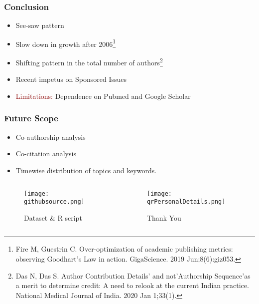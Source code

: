 \documentclass[14pt, aspectratio=169]{beamer}
\begin{document}
\begin{frame}
  \frametitle{Conclusion}
  \begin{itemize}
    \item See-saw pattern 
    \item Slow down in growth after 2006\footnote{Fire M, Guestrin C. Over-optimization of academic publishing metrics: observing Goodhart’s Law in action. GigaScience. 2019 Jun;8(6):giz053.}
    \item Shifting pattern in the total number of authors\footnote{Das N, Das S. Author Contribution Details' and not'Authorship Sequence'as a merit to determine credit: A need to relook at the current Indian practice. National Medical Journal of India. 2020 Jan 1;33(1).}
    \item Recent impetus on Sponsored Issues
    \item \textcolor{darkred}{Limitations:} Dependence on Pubmed and Google Scholar
  \end{itemize}
\end{frame}

\begin{frame}
  \frametitle{Future Scope}
  \begin{itemize}
    \item Co-authorship analysis
    \item Co-citation analysis
    \item Timewise distribution of topics and keywords. 
  \end{itemize}
  \begin{columns}[c]
    \begin{column}{0.5\textwidth}
      \begin{figure}
      \texttt{[image: githubsource.png]}
      \caption{Dataset \& R script}
      \end{figure}
    \end{column}
    \begin{column}{0.5\textwidth}
      \begin{figure}
      \texttt{[image: qrPersonalDetails.png]}
      \caption{Thank You}
      \end{figure}
    \end{column}
  \end{columns}
\end{frame}
\end{document}
